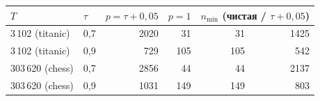 \begin{tabular}{llrrrr}
\toprule
$T$ & $\tau$ & $p=\tau+0{,}05$ & $p=1$ & \multicolumn{2}{l}{$n_{\min}$ (чистая / $\tau+0{,}05$)}\\
\midrule
3\,102 (titanic) & 0{,}7 & 2020 & 31 & 31 & 1425\\
3\,102 (titanic) & 0{,}9 & 729 & 105 & 105 & 542\\
303\,620 (chess) & 0{,}7 & 2856 & 44 & 44 & 2137\\
303\,620 (chess) & 0{,}9 & 1031 & 149 & 149 & 803\\
\bottomrule
\end{tabular}

